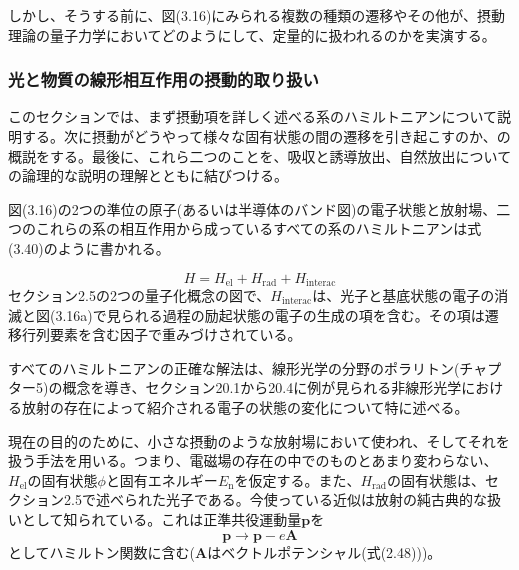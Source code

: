 \documentclass[11pt,a4j,uplatex]{jsarticle}
\begin{document}
しかし、そうする前に、図(3.16)にみられる複数の種類の遷移やその他が、摂動理論の量子力学においてどのようにして、定量的に扱われるのかを実演する。

\newpage
\subsubsection{光と物質の線形相互作用の摂動的取り扱い}
このセクションでは、まず摂動項を詳しく述べる系のハミルトニアンについて説明する。次に摂動がどうやって様々な固有状態の間の遷移を引き起こすのか、の概説をする。最後に、これら二つのことを、吸収と誘導放出、自然放出についての論理的な説明の理解とともに結びつける。

図(3.16)の2つの準位の原子(あるいは半導体のバンド図)の電子状態と放射場、二つのこれらの系の相互作用から成っているすべての系のハミルトニアンは式(3.40)のように書かれる。

\begin{equation}
  H=H_{\mathrm{el}}+H_{\mathrm{rad}}+H_{\mathrm{interac}}\tag{3.40}
\end{equation}
セクション2.5の2つの量子化概念の図で、$H_{\mathrm{interac}}$は、光子と基底状態の電子の消滅と図(3.16a)で見られる過程の励起状態の電子の生成の項を含む。その項は遷移行列要素を含む因子で重みづけされている。

すべてのハミルトニアンの正確な解法は、線形光学の分野のポラリトン(チャプター5)の概念を導き、セクション20.1から20.4に例が見られる非線形光学における放射の存在によって紹介される電子の状態の変化について特に述べる。

現在の目的のために、小さな摂動のような放射場において使われ、そしてそれを扱う手法を用いる。つまり、電磁場の存在の中でのものとあまり変わらない、$H_{\mathrm{el}}$の固有状態$\phi$と固有エネルギー$E_{\mathrm{n}}$を仮定する。また、$H_{\mathrm{rad}}$の固有状態は、セクション2.5で述べられた光子である。今使っている近似は放射の純古典的な扱いとして知られている。これは正準共役運動量$\bm{p}$を
\begin{equation}
  \bm{p}\to \bm{p}-e\bm{A}\tag{3.32}
\end{equation}
としてハミルトン関数に含む($\bm{A}$はベクトルポテンシャル(式(2.48)))。
\end{document}
